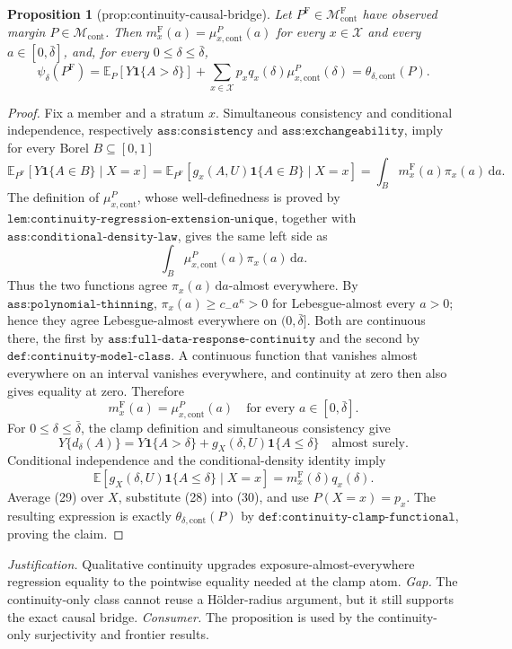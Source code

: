 \documentclass{article}
\newtheorem{proposition}{Proposition}
\begin{document}
\begin{proposition}[prop:continuity-causal-bridge]\label{prop:continuity-causal-bridge}
Let \(P^{\mathrm F}\in\mathcal M_{\mathrm{cont}}^{\mathrm F}\) have observed margin \(P\in\mathcal M_{\mathrm{cont}}\).  Then \(m_x^{\mathrm F}(a)=\mu_{x,\mathrm{cont}}^P(a)\) for every \(x\in\mathcal X\) and every \(a\in[0,\bar\delta]\), and, for every \(0\leq\delta\leq\bar\delta\),
\[
 \psi_\delta(P^{\mathrm F})
 =\mathbb E_P[Y\mathbf 1\{A>\delta\}]
 +\sum_{x\in\mathcal X}p_xq_x(\delta)\mu_{x,\mathrm{cont}}^P(\delta)
 =\theta_{\delta,\mathrm{cont}}(P).
\]
\end{proposition}
\begin{proof}
Fix a member and a stratum \(x\).  Simultaneous consistency and conditional independence, respectively \(\texttt{ass:consistency}\) and \(\texttt{ass:exchangeability}\), imply for every Borel \(B\subseteq[0,1]\)
\[
 \mathbb E_{P^{\mathrm F}}[Y\mathbf 1\{A\in B\}\mid X=x]
 =\mathbb E_{P^{\mathrm F}}[g_x(A,U)\mathbf 1\{A\in B\}\mid X=x]
 =\int_Bm_x^{\mathrm F}(a)\pi_x(a)\,\mathrm da. \tag{26}
\]
The definition of \(\mu_{x,\mathrm{cont}}^P\), whose well-definedness is proved by \(\texttt{lem:continuity-regression-extension-unique}\), together with \(\texttt{ass:conditional-density-law}\), gives the same left side as
\[
 \int_B\mu_{x,\mathrm{cont}}^P(a)\pi_x(a)\,\mathrm da. \tag{27}
\]
Thus the two functions agree \(\pi_x(a)\,\mathrm da\)-almost everywhere.  By \(\texttt{ass:polynomial-thinning}\), \(\pi_x(a)\geq c_-a^\kappa>0\) for Lebesgue-almost every \(a>0\); hence they agree Lebesgue-almost everywhere on \((0,\bar\delta]\).  Both are continuous there, the first by \(\texttt{ass:full-data-response-continuity}\) and the second by \(\texttt{def:continuity-model-class}\).  A continuous function that vanishes almost everywhere on an interval vanishes everywhere, and continuity at zero then also gives equality at zero.  Therefore
\[
 m_x^{\mathrm F}(a)=\mu_{x,\mathrm{cont}}^P(a)
 \quad\text{for every }a\in[0,\bar\delta]. \tag{28}
\]
For \(0\leq\delta\leq\bar\delta\), the clamp definition and simultaneous consistency give
\[
 Y\{d_\delta(A)\}
 =Y\mathbf 1\{A>\delta\}+g_X(\delta,U)\mathbf 1\{A\leq\delta\}
 \quad\text{almost surely}. \tag{29}
\]
Conditional independence and the conditional-density identity imply
\[
 \mathbb E[g_X(\delta,U)\mathbf 1\{A\leq\delta\}\mid X=x]
 =m_x^{\mathrm F}(\delta)q_x(\delta). \tag{30}
\]
Average (29) over \(X\), substitute (28) into (30), and use \(P(X=x)=p_x\).  The resulting expression is exactly \(\theta_{\delta,\mathrm{cont}}(P)\) by \(\texttt{def:continuity-clamp-functional}\), proving the claim.
\end{proof}
\par\smallskip\noindent \textit{Justification.} Qualitative continuity upgrades exposure-almost-everywhere regression equality to the pointwise equality needed at the clamp atom. \textit{Gap.} The continuity-only class cannot reuse a Hölder-radius argument, but it still supports the exact causal bridge. \textit{Consumer.} The proposition is used by the continuity-only surjectivity and frontier results.
\end{document}

